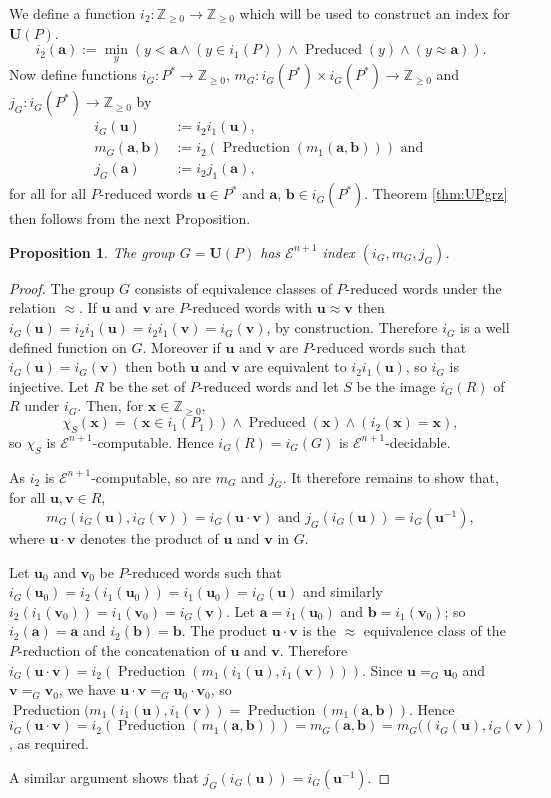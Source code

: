 \documentclass[a4paper]{article}
\newcommand{\grz}[1]{$\mathcal{E}^{#1}$}	%
\newcommand{\Zpos}{\mathbb{Z}_{\geq 0}}
\newcommand{\maps}{\longrightarrow}
\newcommand{\avec}{\mathbf{a}}	%
\newcommand{\bvec}{\mathbf{b}}	%
\newcommand{\uvec}{\mathbf{u}}	%
\newcommand{\vvec}{\mathbf{v}}	%
\newcommand{\xvec}{\mathbf{x}}	%
\newcommand{\Uvec}{\mathbf{U}}	%
\newcommand{\UP}{\Uvec(P)}
\newcommand{\Preduced}{\operatorname{Preduced}}
\newcommand{\Preduction}{\operatorname{Preduction}}
\theoremstyle{plain}
\newtheorem{proposition}[theorem]{Proposition}
\theoremstyle{definition}
\begin{document}
We define a function $i_2:\Zpos\maps \Zpos$ which will be used to construct an
index for $\UP$. 
\begin{equation}\label{eq:i2}
i_2(\avec):=\min_y(y<\avec \wedge (y\in i_1(P)) \wedge \Preduced(y) \wedge (y\approx \avec)).
\end{equation}
Now define functions $i_G:P^*\maps \Zpos$, 
$m_G:i_G(P^*)\times i_G(P^*) \maps \Zpos$
and $j_G:i_G(P^*)\maps \Zpos$ by 
\begin{align}
i_G(\uvec) &:=i_2i_1(\uvec),\\
m_G(\avec, \bvec)& :=i_2(\Preduction(m_1(\avec,\bvec))) \textrm{ and }\\
j_G(\avec)&:= i_2j_1(\avec),
\end{align}
for all for all $P$-reduced words $\uvec\in P^*$ and $\avec$, $\bvec \in i_G(P^*)$. 
Theorem \ref{thm:UPgrz} then follows from the next Proposition. 
\begin{proposition}
The group $G=\UP$ has \grz{n+1} index $(i_G,m_G,j_G)$. 
\end{proposition}

\begin{proof}
The group $G$ consists of equivalence classes of $P$-reduced words under the  relation $\approx$.
If $\uvec$ and $\vvec$ are $P$-reduced words with $\uvec\approx \vvec$ then 
$i_G(\uvec)=i_2i_1(\uvec)=i_2i_1(\vvec)=i_G(\vvec)$, by construction. Therefore $i_G$ is 
a well defined function on $G$.  Moreover if  $\uvec$ and $\vvec$ are $P$-reduced words
such that $i_G(\uvec)=i_G(\vvec)$ then both $\uvec$ and 
$\vvec$ are equivalent to $i_2i_1(\uvec)$, so $i_G$ is injective. Let $R$ be the set of 
$P$-reduced words and let $S$ be the image $i_G(R)$ of $R$ under $i_G$. Then, for $\xvec\in \Zpos$, 
\[\chi_S(\xvec)=(\xvec\in i_1(P_1)) \wedge \Preduced(\xvec) \wedge (i_2(\xvec)=\xvec),\]
so $\chi_S$ is \grz{n+1}-computable. Hence $i_G(R)=i_G(G)$ is \grz{n+1}-decidable. 

As $i_2$ is \grz{n+1}-computable, so are $m_G$ and $j_G$. It therefore remains to
show that, for all $\uvec,\vvec \in R$, 
\[m_G(i_G(\uvec),i_G(\vvec))=i_G(\uvec\cdot \vvec)\textrm{ and } j_G(i_G(\uvec))=i_G(\uvec^{-1}),\]
where $\uvec\cdot \vvec$ denotes the product of $\uvec$ and $\vvec$ in $G$. 

Let $\uvec_0$ and $\vvec_0$ be $P$-reduced words such that $i_G(\uvec_0)=i_2(i_1(\uvec_0))=i_1(\uvec_0)=
i_G(\uvec)$ and similarly $i_2(i_1(\vvec_0))=i_1(\vvec_0)=
i_G(\vvec)$. Let $\avec=i_1(\uvec_0)$ and $\bvec=i_1(\vvec_0)$; so $i_2(\avec)=\avec$ and 
$i_2(\bvec)=\bvec$.  
The product  $\uvec\cdot \vvec$ is the $\approx$ equivalence class of the
$P$-reduction of the concatenation of $\uvec$ and $\vvec$. Therefore 
$i_G(\uvec\cdot \vvec)=i_2(\Preduction(m_1(i_1(\uvec),i_1(\vvec))))$.  
Since $\uvec=_G \uvec_0$ and $\vvec=_G \vvec_0$, we have $\uvec\cdot \vvec=_G \uvec_0\cdot \vvec_0$, 
so  $\Preduction(m_1(i_1(\uvec),i_1(\vvec))= \Preduction(m_1(\avec,\bvec)).$ Hence 
$i_G(\uvec\cdot \vvec)=i_2(\Preduction(m_1(\avec,\bvec)))=m_G(\avec,\bvec)=m_G((i_G(\uvec),i_G(\vvec))$,
 as required.

A similar argument shows that $j_G(i_G(\uvec))=i_G(\uvec^{-1})$.
\end{proof}
\end{document}
